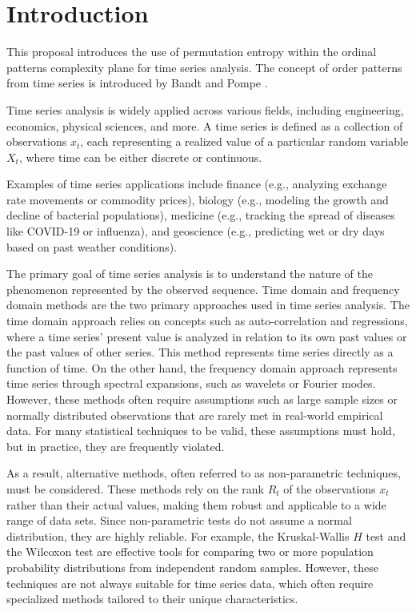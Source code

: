 \chapter{Introduction}\label{C:intro}

This proposal introduces the use of permutation entropy
within the ordinal patterns complexity plane for time series analysis. 
The concept of order patterns from time series is introduced by Bandt and Pompe \cite{PhysRevLett.88.174102}. 

Time series analysis is widely applied across various fields, including engineering, economics, physical sciences, and more. A time series is defined as a collection of observations ${x_t}$, each representing a realized value of a particular random variable $X_t$, where time can be either discrete or continuous.

Examples of time series applications include finance (e.g., analyzing exchange rate movements or commodity prices), biology (e.g., modeling the growth and decline of bacterial populations), medicine (e.g., tracking the spread of diseases like COVID-19 or influenza), and geoscience (e.g., predicting wet or dry days based on past weather conditions).

The primary goal of time series analysis is to understand the nature of the phenomenon represented by the observed sequence. Time domain and frequency domain methods are the two primary approaches used in time series analysis. The time domain approach relies on concepts such as auto-correlation and regressions, where a time series' present value is analyzed in relation to its own past values or the past values of other series. This method represents time series directly as a function of time. On the other hand, the frequency domain approach represents time series through spectral expansions, such as wavelets or Fourier modes. 
However, these methods 
often require assumptions such as large sample sizes or normally distributed observations that are rarely met in real-world empirical data. For many statistical techniques to be valid, these assumptions must hold, but in practice, they are frequently violated.

As a result, alternative methods, often referred to as non-parametric techniques, must be considered. These methods rely on the rank $R_t$ of the observations $x_t$ rather than their actual values, making them robust and applicable to a wide range of data sets. Since non-parametric tests do not assume a normal distribution, they are highly reliable. For example, the Kruskal-Wallis $H$ test and the Wilcoxon test are effective tools for comparing two or more population probability distributions from independent random samples. However, these techniques are not always suitable for time series data, which often require specialized methods tailored to their unique characteristics.

